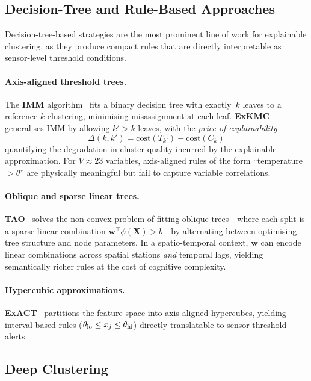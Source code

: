\documentclass{article}
\theoremstyle{plain}
\theoremstyle{definition}
\theoremstyle{remark}
\begin{document}
\subsection{Decision-Tree and Rule-Based Approaches}

Decision-tree-based strategies are the most prominent line of work for
explainable clustering, as they produce compact rules that are directly
interpretable as sensor-level threshold conditions.

\paragraph{Axis-aligned threshold trees.}
The \textbf{IMM} algorithm~\cite{dasgupta_explainable_nodate} fits a binary decision
tree with exactly~$k$ leaves to a reference $k$-clustering, minimising
misassignment at each leaf. \textbf{ExKMC}~\cite{frost_exkmc_2020} generalises
IMM by allowing $k'>k$ leaves, with the \emph{price of explainability}
\[
  \Delta(k,k') = \mathrm{cost}(T_{k'}) - \mathrm{cost}(C_k)
\]
quantifying the degradation in cluster quality incurred by the
explainable approximation. For $V \approx 23$ variables, axis-aligned
rules of the form ``temperature $> \theta$'' are physically meaningful
but fail to capture variable correlations.

\paragraph{Oblique and sparse linear trees.}
\textbf{TAO}~\cite{gabidolla_optimal_2022} solves the non-convex problem of fitting
oblique trees---where each split is a sparse linear combination
$\mathbf{w}^\top\phi(\mathbf{X}) > b$---by alternating between
optimising tree structure and node parameters. In a spatio-temporal
context, $\mathbf{w}$ can encode linear combinations across spatial
stations \emph{and} temporal lags, yielding semantically richer rules
at the cost of cognitive complexity.

\paragraph{Hypercubic approximations.}
\textbf{ExACT}~\cite{sabbatini_exact_nodate} partitions the feature space into
axis-aligned hypercubes, yielding interval-based rules
($\theta_{\rm lo} \le x_j \le \theta_{\rm hi}$) directly translatable
to sensor threshold alerts.

\subsection{Deep Clustering}
\end{document}
